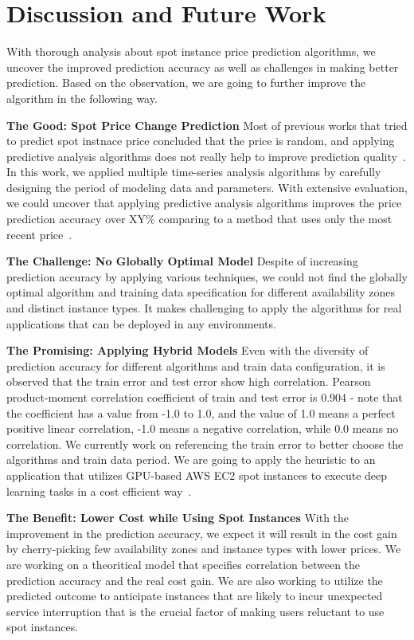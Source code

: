 \documentclass[graybox]{svmult}
\begin{document}
\section{Discussion and Future Work}
With thorough analysis about spot instance price prediction algorithms, we uncover the improved prediction accuracy as well as challenges in making better prediction. Based on the observation, we are going to further improve the algorithm in the following way.  

\textbf{The Good: Spot Price Change Prediction} Most of previous works that tried to predict spot instnace price concluded that the price is random, and applying predictive analysis algorithms does not really help to improve prediction quality~\cite{spot-instance-pricing-analysis,spot-price-han-arima}. In this work, we applied multiple time-series analysis algorithms by carefully designing the period of modeling data and parameters. With extensive evaluation, we could uncover that applying predictive analysis algorithms improves the price prediction accuracy over XY\% comparing to a method that uses only the most recent price~\cite{deep-spot-cloud,not-bid-cloud}.

\textbf{The Challenge: No Globally Optimal Model} Despite of increasing prediction accuracy by applying various techniques, we could not find the globally optimal algorithm and training data specification for different availability zones and distinct instance types. It makes challenging to apply the algorithms for real applications that can be deployed in any environments. 

\textbf{The Promising: Applying Hybrid Models} Even with the diversity of prediction accuracy for different algorithms and train data configuration, it is observed that the train error and test error show high correlation. Pearson product-moment correlation coefficient of train and test error is 0.904 - note that the coefficient has a value from -1.0 to 1.0, and the value of 1.0 means a perfect positive linear correlation, -1.0 means a negative correlation, while 0.0 means no correlation. We currently work on referencing the train error to better choose the algorithms and train data period. We are going to apply the heuristic to an application that utilizes GPU-based AWS EC2 spot instances to execute deep learning tasks in a cost efficient way~\cite{deep-spot-cloud}. 

\textbf{The Benefit: Lower Cost while Using Spot Instances} With the improvement in the prediction accuracy, we expect it will result in the cost gain by cherry-picking few availability zones and instance types with lower prices. We are working on a theoritical model that specifies correlation between the prediction accuracy and the real cost gain. We are also working to utilize the predicted outcome to anticipate instances that are likely to incur unexpected service interruption that is the crucial factor of making users reluctant to use spot instances.  
\end{document}

